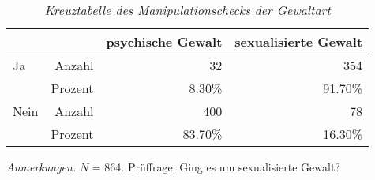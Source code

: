 \begin{table}[htb]
    \caption[Kreuztabelle Manipulationscheck Gewaltart]{\textit {Kreuztabelle des Manipulationschecks der Gewaltart}} 
    \label{KT_G}
    \centering
    \begin{adjustbox}{width=\textwidth}
    \small
    \begin{tabular}{lrrr}
      \hline
        &   & psychische Gewalt & sexualisierte Gewalt \\
      \hline
    Ja   & Anzahl  & 32      & 354     \\
         & Prozent & 8.30\%  & 91.70\% \\
    Nein & Anzahl  & 400     & 78      \\
         & Prozent & 83.70\% & 16.30\% \\
       \hline
    \end{tabular}
    \end{adjustbox}
    
    \begin{tablenotes}
        \item \textit{Anmerkungen.} \( N \) = 864. Prüffrage: Ging es um sexualisierte Gewalt?
      \end{tablenotes}
    \end{table}